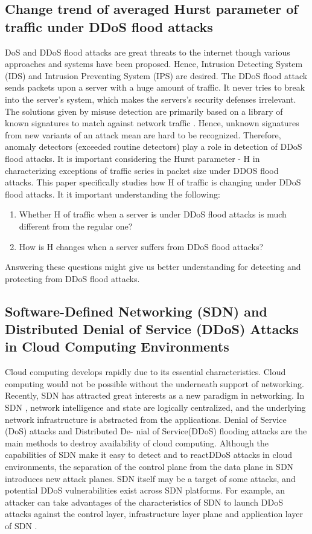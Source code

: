 \documentclass{report}
\begin{document}
\subsection {Change trend of averaged Hurst parameter of traffic under DDoS flood attacks}
\gls{DoS} and \gls{DDoS} flood attacks are great threats to the internet though various approaches and systems have been proposed. Hence, Intrusion Detecting System (IDS) and Intrusion Preventing System (\gls{IPS}) are desired. The \gls{DDoS} flood attack sends packets upon a server with a huge amount of traffic. It never tries to break into the server’s system, which makes the servers’s security defenses irrelevant.
\hfill \break
The solutions given by misuse detection are primarily based on a library of known signatures to match against network traffic . Hence, unknown signatures from new variants of an attack mean are hard to be recognized. Therefore, anomaly detectors (exceeded routine detectors) play a role in detection of \gls{DDoS} flood attacks.
\hfill \break
It is important considering the Hurst parameter - H in characterizing exceptions of traffic series in packet size under DDOS flood attacks. This paper specifically  \cite{Hurst} studies how H of traffic is changing under \gls{DDoS} flood attacks. It it important understanding the following:
\begin{enumerate}
\item Whether H of traffic when a server is under \gls{DDoS} flood attacks is much different from the regular one?
\item How is H changes when a server suffers from \gls{DDoS} flood attacks?
\end{enumerate}
Answering these questions might give us better understanding for detecting and protecting from \gls{DDoS} flood attacks.
\hfill \break

\subsection{Software-Defined Networking (SDN) and Distributed Denial of Service (DDoS) Attacks in Cloud Computing Environments }
Cloud computing develops rapidly due to its essential characteristics. Cloud computing would not be possible without the underneath support of networking. Recently, \gls{SDN}  \cite{SDN} has attracted great interests as a new paradigm in networking. In \gls{SDN} , network intelligence and state are logically centralized, and the underlying network infrastructure is abstracted from the applications. Denial of Service (\gls{DoS}) attacks and Distributed De-
nial of Service(\gls{DDoS}) flooding attacks are the main methods to destroy availability of cloud computing.
Although the capabilities of \gls{SDN}  make it easy to detect and to react\gls{DDoS} attacks in cloud environments, the separation of the control plane from the data plane in \gls{SDN}  introduces new attack planes. \gls{SDN}  itself may be a target of some attacks, and potential \gls{DDoS} vulnerabilities exist across \gls{SDN}  platforms. For example, an attacker can take advantages of the characteristics of \gls{SDN}  to launch \gls{DDoS} attacks against the control layer, infrastructure layer plane and application layer of \gls{SDN} .
 \hfill \break
\end{document}

